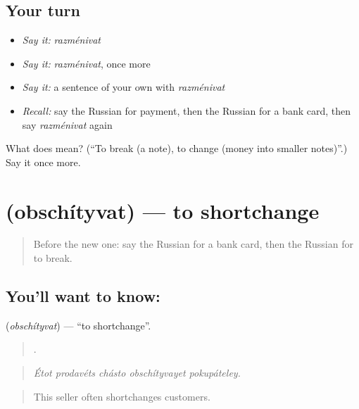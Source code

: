 \subsection*{Your turn}
\begin{itemize}
\raggedright
  \item \emph{Say it:} \emph{razménivat}
  \item \emph{Say it:} \emph{razménivat}, once more
  \item \emph{Say it:} a sentence of your own with \emph{razménivat}
  \item \emph{Recall:} say the Russian for payment, then the Russian for a bank card, then say \emph{razménivat} again
\end{itemize}

\begin{tcolorbox}[breakable,colback=teal!4,colframe=teal!35!black,title={Before you move on}]
What does  mean? (\textquotedblleft{}To break (a note), to change (money into smaller notes)\textquotedblright{}.) Say it once more.
\end{tcolorbox}
\section[\texorpdfstring{\ru{обсчитывать} (obschítyvat)}{обсчитывать (obschítyvat)}]{ (obschítyvat) — to shortchange}

\label{lesson:RU-C455-obschityvat}



\begin{quote}
Before the new one: say the Russian for a bank card, then the Russian for to break.
\end{quote}

\subsection*{You'll want to know: }
\textbf{} (\emph{obschítyvat}) — \textquotedblleft{}to shortchange\textquotedblright{}.

\begin{quote}
    .
\end{quote}

\begin{quote}
\emph{Étot prodavéts chásto obschítyvayet pokupáteley.}
\end{quote}

\begin{quote}
This seller often shortchanges customers.
\end{quote}

